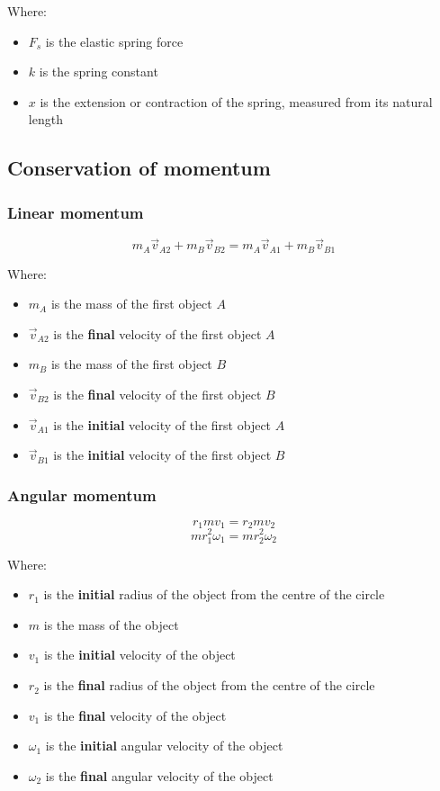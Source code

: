 \documentclass[11pt]{article}
\begin{document}
Where:
\begin{itemize}
\item \(F_s\) is the elastic spring force
\item \(k\) is the spring constant
\item \(x\) is the extension or contraction of the spring, measured from its natural length
\end{itemize}
\subsection{Conservation of momentum}
\label{sec:orga637441}

\subsubsection{Linear momentum}
\label{sec:orgfa6c29b}
\[m_A \vec{v}_{A2} + m_B \vec{v}_{B2} = m_A \vec{v}_{A1} + m_B \vec{v}_{B1}\]

Where:
\begin{itemize}
\item \(m_A\) is the mass of the first object \(A\)
\item \(\vec{v}_{A2}\) is the \textbf{final} velocity of the first object \(A\)
\item \(m_B\) is the mass of the first object \(B\)
\item \(\vec{v}_{B2}\) is the \textbf{final} velocity of the first object \(B\)
\item \(\vec{v}_{A1}\) is the \textbf{initial} velocity of the first object \(A\)
\item \(\vec{v}_{B1}\) is the \textbf{initial} velocity of the first object \(B\)
\end{itemize}

 \newpage
\subsubsection{Angular momentum}
\label{sec:orgcf37834}
\[r_1 mv_1 = r_2 m v_2\]
\[m r_1^2 \omega_1 = m r_2^2 \omega_2\]

Where:
\begin{itemize}
\item \(r_1\) is the \textbf{initial} radius of the object from the centre of the circle
\item \(m\) is the mass of the object
\item \(v_1\) is the \textbf{initial} velocity of the object
\item \(r_2\) is the \textbf{final} radius of the object from the centre of the circle
\item \(v_1\) is the \textbf{final} velocity of the object
\item \(\omega_1\) is the \textbf{initial} angular velocity of the object
\item \(\omega_2\) is the \textbf{final} angular velocity of the object
\end{itemize}
\end{document}
